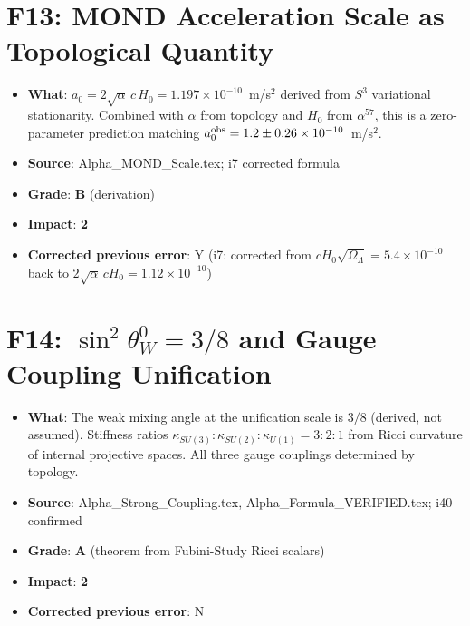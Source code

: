 \documentclass[11pt,a4paper]{article}
\newcommand{\grade}[1]{\textbf{#1}}
\newcommand{\impact}[1]{\textbf{#1}}
\begin{document}
\section{F13: MOND Acceleration Scale as Topological Quantity}
\begin{itemize}[nosep]
\item \textbf{What}: $a_0 = 2\sqrt{\alpha}\,c\,H_0 = 1.197 \times 10^{-10}$~m/s$^2$ derived from $S^3$ variational stationarity. Combined with $\alpha$ from topology and $H_0$ from $\alpha^{57}$, this is a zero-parameter prediction matching $a_0^{\rm obs} = 1.2 \pm 0.26 \times 10^{-10}$~m/s$^2$.
\item \textbf{Source}: Alpha\_MOND\_Scale.tex; i7 corrected formula
\item \textbf{Grade}: \grade{B} (derivation)
\item \textbf{Impact}: \impact{2}
\item \textbf{Corrected previous error}: Y (i7: corrected from $c H_0 \sqrt{\Omega_\Lambda} = 5.4 \times 10^{-10}$ back to $2\sqrt{\alpha}\,c H_0 = 1.12 \times 10^{-10}$)
\end{itemize}

\section{F14: $\sin^2\theta_W^0 = 3/8$ and Gauge Coupling Unification}
\begin{itemize}[nosep]
\item \textbf{What}: The weak mixing angle at the unification scale is $3/8$ (derived, not assumed). Stiffness ratios $\kappa_{SU(3)}:\kappa_{SU(2)}:\kappa_{U(1)} = 3:2:1$ from Ricci curvature of internal projective spaces. All three gauge couplings determined by topology.
\item \textbf{Source}: Alpha\_Strong\_Coupling.tex, Alpha\_Formula\_VERIFIED.tex; i40 confirmed
\item \textbf{Grade}: \grade{A} (theorem from Fubini-Study Ricci scalars)
\item \textbf{Impact}: \impact{2}
\item \textbf{Corrected previous error}: N
\end{itemize}
\end{document}
